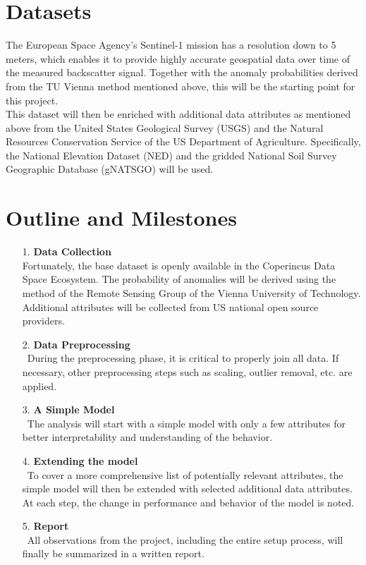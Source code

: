 \documentclass[12pt]{article}
\begin{document}
\section{Datasets}
The European Space Agency's Sentinel-1 mission has a resolution down to 5 meters, which enables it to provide highly accurate geospatial data over time of the measured backscatter signal. Together with the anomaly probabilities derived from the TU Vienna method mentioned above, this will be the starting point for this project.\\
This dataset will then be enriched with additional data attributes as mentioned above from the United States Geological Survey (USGS) and the Natural Resources Conservation Service of the US Department of Agriculture. Specifically, the National Elevation Dataset (NED) and the gridded National Soil Survey Geographic Database (gNATSGO) will be used. 

\section{Outline and Milestones}
\begin{itemize}
    \item[1.] \textbf{Data Collection}\\
        Fortunately, the base dataset is openly available in the Coperincus Data Space Ecosystem. The probability of anomalies will be derived using the method of the Remote Sensing Group of the Vienna University of Technology. Additional attributes will be collected from US national open source providers.
    \item[2.] \textbf{Data Preprocessing}\\\
        During the preprocessing phase, it is critical to properly join all data. If necessary, other preprocessing steps such as scaling, outlier removal, etc. are applied.
    \item[3.] \textbf{A Simple Model}\\\
        The analysis will start with a simple model with only a few attributes for better interpretability and understanding of the behavior.
    \item[4.] \textbf{Extending the model}\\\
        To cover a more comprehensive list of potentially relevant attributes, the simple model will then be extended with selected additional data attributes. At each step, the change in performance and behavior of the model is noted.
    \item[5.] \textbf{Report}\\\
        All observations from the project, including the entire setup process, will finally be summarized in a written report.
\end{itemize}
\end{document}
